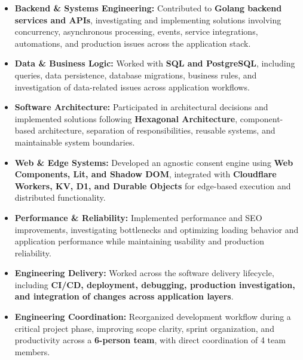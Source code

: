 \documentclass[10pt,a4paper]{article}
\begin{document}
\begin{itemize}
    \item
    \textbf{Backend \& Systems Engineering:}
    Contributed to \textbf{Golang backend services and APIs},
    investigating and implementing solutions involving
    concurrency, asynchronous processing, events, service
    integrations, automations, and production issues across
    the application stack.

    \item
    \textbf{Data \& Business Logic:}
    Worked with \textbf{SQL and PostgreSQL}, including queries,
    data persistence, database migrations, business rules,
    and investigation of data-related issues across
    application workflows.

    \item
    \textbf{Software Architecture:}
    Participated in architectural decisions and implemented
    solutions following \textbf{Hexagonal Architecture},
    component-based architecture, separation of responsibilities,
    reusable systems, and maintainable system boundaries.

    \item
    \textbf{Web \& Edge Systems:}
    Developed an agnostic consent engine using
    \textbf{Web Components, Lit, and Shadow DOM}, integrated with
    \textbf{Cloudflare Workers, KV, D1, and Durable Objects}
    for edge-based execution and distributed functionality.

    \item
    \textbf{Performance \& Reliability:}
    Implemented performance and SEO improvements, investigating
    bottlenecks and optimizing loading behavior and application
    performance while maintaining usability and production
    reliability.

    \item
    \textbf{Engineering Delivery:}
    Worked across the software delivery lifecycle, including
    \textbf{CI/CD, deployment, debugging, production investigation,
    and integration of changes across application layers}.

    \item
    \textbf{Engineering Coordination:}
    Reorganized development workflow during a critical project
    phase, improving scope clarity, sprint organization, and
    productivity across a \textbf{6-person team}, with direct
    coordination of 4 team members.

\end{itemize}

\end{document}
